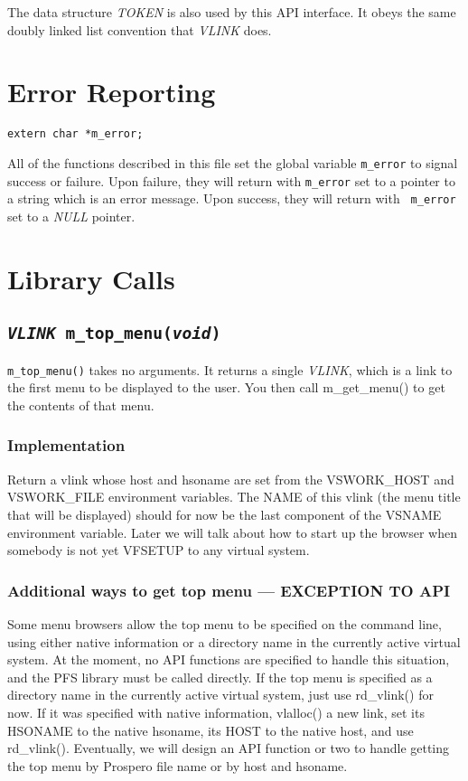 The data structure {\it TOKEN} is also used by this API interface.
It obeys the same doubly linked list convention that {\it VLINK}
does.  

\section {Error Reporting}

\begin{verbatim}
extern char *m_error;
\end{verbatim}

All of the functions described in this file set the global variable
{\tt m\_error} to signal success or failure.  Upon failure, they
will return with {\tt m\_error} set to a pointer to a string which
is an error message.  Upon success, they will return with {\tt
m\_error} set to a {\it NULL} pointer.

\section{Library Calls}

\subsection{\tt {\it VLINK }m\_top\_menu({\it void})}

{\tt m\_top\_menu()} takes no arguments.  It returns a single {\it
VLINK}, which is a link to the first menu to be displayed to the user.
You then call m\_get\_menu() to get the contents of that menu.  

\subsubsection{Implementation}

Return a vlink whose host and hsoname are set from the VSWORK\_HOST and
VSWORK\_FILE environment variables.  The NAME of this vlink (the menu
title that will be displayed) should for now be the last component of
the VSNAME environment variable.  Later we will talk about how to
start up the browser when somebody is not yet VFSETUP to any virtual
system.

\subsubsection{Additional ways to get top menu --- EXCEPTION TO API}

Some menu browsers allow the top menu to be specified on the command
line, using either native information or a directory name in the
currently active virtual system.  At the moment, no API functions are
specified to handle this situation, and the PFS library must be called
directly.  If the top menu is specified as a directory name in the
currently active virtual system, just use rd\_vlink() for now.  If it
was specified with native information, vlalloc() a new link, set its
HSONAME to the native hsoname, its HOST to the native host, and use
rd\_vlink().  Eventually, we will design an API function or two to
handle getting the top menu by Prospero file name or by host and
hsoname.


